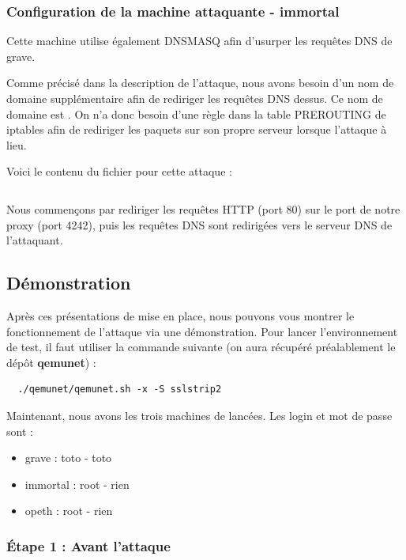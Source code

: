 \inputminted[bgcolor=lbcolor, breaklines]{shell}{../sslstrip2/opeth/start.sh}

\subsubsection{Configuration de la machine attaquante - immortal}


Cette machine utilise également DNSMASQ afin d'usurper les requêtes DNS de grave.

Comme précisé dans la description de l'attaque, nous avons besoin d'un nom de domaine supplémentaire afin de rediriger les requêtes DNS dessus. Ce nom de domaine est . On n'a donc besoin d'une règle dans la table PREROUTING de iptables afin de rediriger les paquets sur son propre serveur lorsque l'attaque à lieu.

Voici le contenu du fichier  pour cette attaque :

\inputminted[bgcolor=lbcolor, breaklines]{shell}{../sslstrip2/immortal/attack.sh}

Nous commençons par rediriger les requêtes HTTP (port 80) sur le port de notre proxy (port 4242), puis les requêtes DNS sont redirigées vers le serveur DNS de l'attaquant.

\subsection{Démonstration}

Après ces présentations de mise en place, nous pouvons vous montrer le fonctionnement de l'attaque via une démonstration. Pour lancer l'environnement de test, il faut utiliser la commande suivante (on aura récupéré préalablement le dépôt \textbf{qemunet}) :

\begin{verbatim}
  ./qemunet/qemunet.sh -x -S sslstrip2
\end{verbatim}

Maintenant, nous avons les trois machines de lancées. Les login et mot de passe sont :

\begin{itemize}
\item grave : toto - toto
\item immortal : root - rien
\item opeth : root - rien
\end{itemize}

\subsubsection{Étape 1 : Avant l'attaque}

